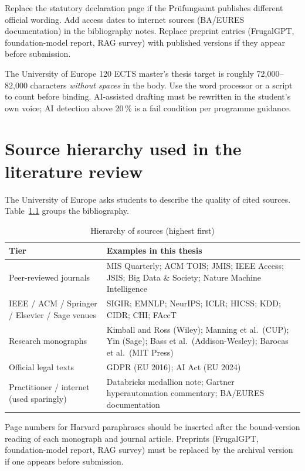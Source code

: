 Replace the statutory declaration page if the Pr\"ufungsamt publishes different official wording. Add access dates to internet sources (BA/EURES documentation) in the bibliography notes. Replace preprint entries (FrugalGPT, foundation-model report, RAG survey) with published versions if they appear before submission.

The University of Europe 120 ECTS master's thesis target is roughly 72{,}000--82{,}000 characters \emph{without spaces} in the body. Use the word processor or a script to count before binding. AI-assisted drafting must be rewritten in the student's own voice; AI detection above 20\,\% is a fail condition per programme guidance.

\chapter{Source hierarchy used in the literature review}
\label{app:sources}

The University of Europe asks students to describe the quality of cited sources. Table~\ref{tab:hierarchy} groups the bibliography.

\begin{table}[ht]
\centering
\caption{Hierarchy of sources (highest first)}
\label{tab:hierarchy}
\begin{tabularx}{\textwidth}{@{}lX@{}}
\toprule
\textbf{Tier} & \textbf{Examples in this thesis} \\
\midrule
Peer-reviewed journals & MIS Quarterly; ACM TOIS; JMIS; IEEE Access; JSIS; Big Data \& Society; Nature Machine Intelligence \\
IEEE / ACM / Springer / Elsevier / Sage venues & SIGIR; EMNLP; NeurIPS; ICLR; HICSS; KDD; CIDR; CHI; FAccT \\
Research monographs & Kimball and Ross (Wiley); Manning et al.\ (CUP); Yin (Sage); Bass et al.\ (Addison-Wesley); Barocas et al.\ (MIT Press) \\
Official legal texts & GDPR (EU 2016); AI Act (EU 2024) \\
Practitioner / internet (used sparingly) & Databricks medallion note; Gartner hyperautomation commentary; BA/EURES documentation \\
\bottomrule
\end{tabularx}
\end{table}

Page numbers for Harvard paraphrases should be inserted after the bound-version reading of each monograph and journal article. Preprints (FrugalGPT, foundation-model report, RAG survey) must be replaced by the archival version if one appears before submission.

